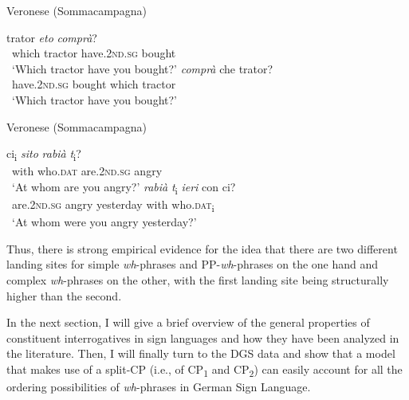 \begin{exe}
\ex Veronese (Sommacampagna)\label{morenorthernitaliana}\begin{xlist}
\ex{} {trator} {\textit{eto}} {\textit{comprà}?} \\
{\textcolor{white}{*}which} {tractor} {have.\textsc{2nd.sg}} {bought}  \\
\trans \textcolor{white}{*}`Which tractor have you bought?' \label{morenorthernitalianaa} 
\ex{} {\textit{comprà}} {che} {trator?} \\
{\textcolor{white}{*}have.\textsc{2nd.sg}} {bought} {which} {tractor}  \\
\trans \textcolor{white}{*}`Which tractor have you bought?' \label{morenorthernitalianab} 
\end{xlist}
\end{exe}

\clearpage

\begin{exe}
\ex Veronese (Sommacampagna)\label{morenorthernitalianb}\begin{xlist}
\ex{} {ci\textsubscript{i}} {\textit{sito}} {\textit{rabià}} {\textit{t}\textsubscript{i}?}  \\
{\textcolor{white}{*}with} {who.\textsc{dat}} {are.\textsc{2nd.sg}} {angry} {} \\
\trans \textcolor{white}{*}`At whom are you angry?' \label{morenorthernitalianba} 
\ex{} {\textit{rabià}} {\textit{t}\textsubscript{i}} {\textit{ieri}} {con} {ci?}  \\
{\textcolor{white}{*}are.\textsc{2nd.sg}} {angry} {} {yesterday} {with} {who.\textsc{dat}\textsubscript{i}}\\
\trans \textcolor{white}{*}`At whom were you angry yesterday?' \label{morenorthernitalianbb} 
\end{xlist}
\end{exe}

\noindent Thus, there is strong empirical evidence for the idea that there are two different landing sites for simple \textit{wh}-phrases and PP-\textit{wh}-phrases on the one hand and complex \textit{wh}-phrases on the other, with the first landing site being structurally higher than the second. 

In the next section, I will give a brief overview of the general properties of constituent interrogatives in sign languages and how they have been analyzed in the literature. Then, I will finally turn to the DGS data and show that a model that makes use of a split-CP (i.e., of CP\textsubscript{1} and CP\textsubscript{2}) can easily account for all the ordering possibilities of \textit{wh}-phrases in German Sign Language. 

